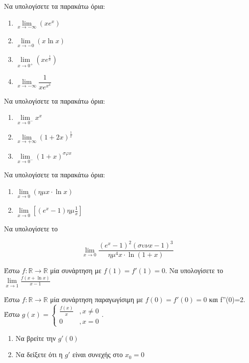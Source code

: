 \documentclass{presentation}
\begin{document}
\begin{askisi}
    Να υπολογίσετε τα παρακάτω όρια:
    \begin{enumerate}
        \item<1-> $\lim\limits_{x \to -\infty}{ (xe^x) }$
        \item<2-> $\lim\limits_{x \to -0}{ (x\ln x) }$
        \item<3-> $\lim\limits_{x \to 0^+}{ \left( xe^{\frac{1}{x}} \right)  }$
        \item<4-> $\lim\limits_{x \to -\infty}{ \dfrac{1}{xe^{x^3}} }$
    \end{enumerate}

\end{askisi}

\begin{askisi}
    Να υπολογίσετε τα παρακάτω όρια:
    \begin{enumerate}[<+->]
        \item $\lim\limits_{x \to 0^-}{ x^x }$
        \item $\lim\limits_{x \to +\infty}{ \left( 1+2x \right)^{\frac{1}{x}}  }$
        \item $\lim\limits_{x \to 0^-}{ \left( 1+x \right)^{σφx}  }$
    \end{enumerate}
\end{askisi}

\begin{askisi}
    Να υπολογίσετε τα παρακάτω όρια:
    \begin{enumerate}[<+->]
        \item $\lim\limits_{x \to 0}{ \left( ημx\cdot \ln x \right)  }$
        \item $\lim\limits_{x \to 0}{ \left[ (e^x-1)ημ\frac{1}{x} \right]  }$
    \end{enumerate}
\end{askisi}

\begin{askisi}
    Να υπολογίσετε το

    $$\lim\limits_{x \to 0}{ \frac{(e^x-1)^2(συνx-1)^3}{ημ^4x\cdot \ln (1+x)}  }$$
\end{askisi}

\begin{askisi}
    Έστω $f:\mathbb{R}\to\mathbb{R}$ μία συνάρτηση με $f(1)=f'(1)=0$. Να υπολογίσετε το $\lim\limits_{x \to 1}{ \frac{f(x+\ln x)}{x-1}}$
\end{askisi}

\begin{askisi}
    Έστω $f:\mathbb{R}\to\mathbb{R}$ μία συνάρτηση παραγωγίσιμη με $f(0)=f'(0)=0$ και f''(0)=2. Έστω $g(x)=\begin{cases}\frac{f(x)}{x} & ,x\ne 0 \\
             0              & ,x=0\end{cases}$.

    \begin{enumerate}[<+->]
        \item Να βρείτε την $g'(0)$
        \item Να δείξετε ότι η $g'$ είναι συνεχής στο $x_0=0$
    \end{enumerate}
\end{askisi}
\end{document}

